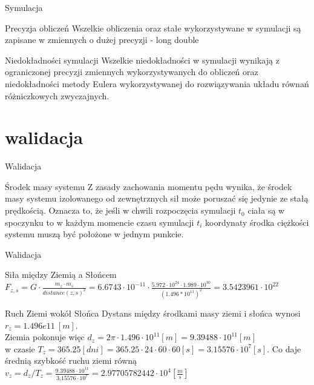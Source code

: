 \documentclass{beamer}
\begin{document}
\begin{frame}{Symulacja}
    \begin{block}{Precyzja obliczeń}
        Wszelkie obliczenia oraz stałe wykorzystywane w symulacji są zapisane w zmiennych o dużej precyzji - long double
    \end{block}
    \begin{block}{Niedokładności symulacji}
        Wszelkie niedokładności w symulacji wynikają z ograniczonej precyzji zmiennych wykorzystywanych do obliczeń oraz niedokładności metody Eulera wykorzystywanej do rozwiązywania układu równań różniczkowych zwyczajnych.
    \end{block}
\end{frame}

\section{walidacja}

\begin{frame}{Walidacja}
    \begin{block}{Środek masy systemu}
        Z zasady zachowania momentu pędu wynika, że środek masy systemu izolowanego od zewnętrznych sił może poruszać się jedynie ze stałą prędkością. Oznacza to, że jeśli w chwili rozpoczęcia symulacji $t_{0}$ ciała są w spoczynku to w każdym momencie czasu symulacji $t_{i}$ koordynaty środka ciężkości systemu muszą być położone w jednym punkcie.
    \end{block}
\end{frame}

\begin{frame}{Walidacja}
    \begin{block}{Siła między Ziemią a Słońcem}
        $F_{z,s} = G\cdot \frac{m_{z}\cdot m_{s}}{distance(z,s)^2} 
        = 6.6743\cdot 10^{-11}\cdot 
        \frac{5.972\cdot 10^{24}\cdot 1.989\cdot 10^{30}}
        {(1.496 * 10^{11})^2} = 3.5423961\cdot 10^{22}$
    \end{block}
    
    \begin{block}{Ruch Ziemi wokół Słońca}
        Dystans między środkami masy ziemi i słońca wynosi $r_z = 1.496e11\ [m]$.\\
        Ziemia pokonuje więc $d_z = 2 \pi \cdot 1.496\cdot 10^{11} [m] = 9.39488\cdot 10^{11} [m]$\\
        w czasie $T_z = 365.25 [dni] = 365.25\cdot 24\cdot 60\cdot 60 [s] = 3.15576\cdot 10^{7} [s]$.
        Co daje średnią szybkość ruchu ziemi równą
        $v_z = d_z / T_z 
        = \frac{9.39488\cdot 10^{11}}{3.15576\cdot 10^{7}} 
        = 2.97705782442\cdot 10^{4} [\frac{m}{s}]$
    \end{block}
\end{frame}
\end{document}
